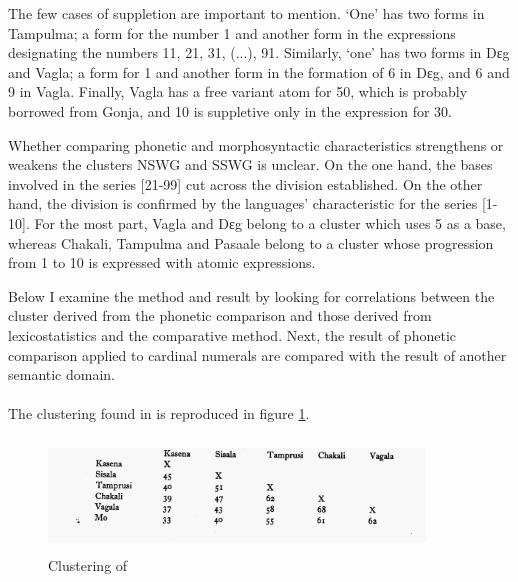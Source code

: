 The few cases of suppletion are important to mention. `One' has two  forms in
Tampulma; a form for the number 1 and another form in the expressions
designating the numbers 11, 21, 31, (...), 91. Similarly, `one' has two  forms
in Dɛg and Vagla; a form for 1 and another form
in the formation of 6 in Dɛg, and 6 and 9 in Vagla. Finally, Vagla has a free
variant atom for 50, which is probably borrowed from Gonja, and 10 is
suppletive only in the expression for 30. 


Whether comparing phonetic and morphosyntactic characteristics  strengthens or
weakens the clusters NSWG and SSWG is unclear. On the one hand, the bases
involved in
the series [21-99] cut across the division established. On the other hand, the
division is confirmed by the languages' characteristic for the series  [1-10].
For the most part, Vagla and Dɛg belong to a cluster which uses 5 as a base,
whereas Chakali, Tampulma and Pasaale belong to a cluster whose progression from
1 to 10 is expressed with atomic expressions. 

Below I examine the method and result by looking for correlations between the
cluster derived from the phonetic comparison and those derived from
lexicostatistics and the comparative method. Next,  the result of
phonetic comparison applied to cardinal numerals are compared with the result of
another
semantic domain.



\paragraph{\cite{Bend65}}
\label{sec:NUM-bend65}

 The clustering found in  \citet[50]{Bend65} is reproduced in figure
\ref{fig:Bend-clust}. 

 \begin{figure}[htbp]
 \centering
\includegraphics[width=10cm,height=3cm]{Graphic/Pictures/File-0001-page.jpg}
\caption{Clustering of \citet[50]{Bend65} \label{fig:Bend-clust}}
\end{figure}

